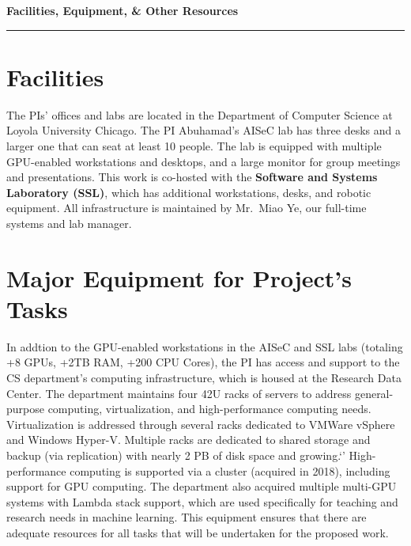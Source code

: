 \setcounter{section}{0}

{\Large\bfseries\filcenter
Facilities, Equipment, \& Other Resources
\\\rule{\textwidth}{0.4pt}}


\section{Facilities}




The PIs' offices and labs are located in the Department of Computer Science at Loyola University Chicago. 
The PI Abuhamad's AISeC lab has three desks and a larger one that can seat at least 10 people.   %
The lab is equipped with multiple GPU-enabled workstations and desktops, and a large monitor for group meetings and presentations.
This work is co-hosted with the  \textbf{Software and Systems Laboratory (SSL)}, which has additional workstations, desks, and robotic equipment.
All infrastructure is maintained by Mr.~Miao Ye, our full-time systems and lab manager.



\section{Major Equipment for Project's Tasks}
In addtion to the GPU-enabled workstations in the AISeC and SSL labs (totaling +8 GPUs, +2TB RAM, +200 CPU Cores), the PI has access and support to the CS department's computing infrastructure, which is housed at the Research Data Center.
The department maintains four 42U racks of servers to address general-purpose computing, virtualization, and high-performance computing needs.
Virtualization is addressed through several racks dedicated to VMWare vSphere and Windows Hyper-V. 
Multiple racks are dedicated to shared storage and backup (via replication) with nearly 2 PB of disk space and growing.`'
High-performance computing is supported via a cluster (acquired in 2018), including support for GPU computing. The department also acquired multiple multi-GPU systems with Lambda stack support, which are used specifically for teaching and research needs in machine learning.
This equipment ensures that there are adequate resources for all tasks that will be undertaken for the proposed work. 



